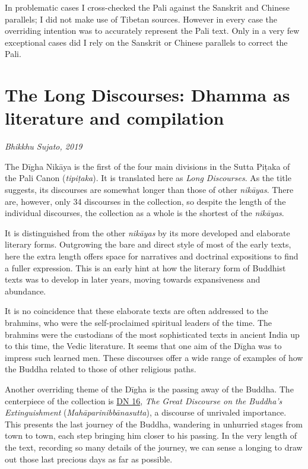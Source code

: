 \documentclass[12pt,openany]{book}%
\newcommand*{\scbyline}[1]{\begin{flushright}\textit{#1}\end{flushright}\bigskip}
\begin{document}
In problematic cases I cross-checked the Pali against the Sanskrit and Chinese parallels; I did not make use of Tibetan sources. However in every case the overriding intention was to accurately represent the Pali text. Only in a very few exceptional cases did I rely on the Sanskrit or Chinese parallels to correct the Pali.

%
\chapter*{The Long Discourses: Dhamma as literature and compilation}

\scbyline{Bhikkhu Sujato, 2019}

The \textsanskrit{Dīgha} \textsanskrit{Nikāya} is the first of the four main divisions in the Sutta \textsanskrit{Piṭaka} of the Pali Canon (\textit{\textsanskrit{tipiṭaka}}). It is translated here as \textit{Long Discourses}. As the title suggests, its discourses are somewhat longer than those of other \textit{\textsanskrit{nikāyas}}. There are, however, only 34 discourses in the collection, so despite the length of the individual discourses, the collection as a whole is the shortest of the \textit{\textsanskrit{nikāyas}}.

It is distinguished from the other \textit{\textsanskrit{nikāyas}} by its more developed and elaborate literary forms. Outgrowing the bare and direct style of most of the early texts, here the extra length offers space for narratives and doctrinal expositions to find a fuller expression. This is an early hint at how the literary form of Buddhist texts was to develop in later years, moving towards expansiveness and abundance.

It is no coincidence that these elaborate texts are often addressed to the brahmins, who were the self-proclaimed spiritual leaders of the time. The brahmins were the custodians of the most sophisticated texts in ancient India up to this time, the Vedic literature. It seems that one aim of the \textsanskrit{Dīgha} was to impress such learned men. These discourses offer a wide range of examples of how the Buddha related to those of other religious paths.

Another overriding theme of the \textsanskrit{Dīgha} is the passing away of the Buddha. The centerpiece of the collection is \href{https://suttacentral.net/dn16}{DN 16}, \textit{The Great Discourse on the Buddha’s Extinguishment} (\textit{\textsanskrit{Mahāparinibbānasutta}}), a discourse of unrivaled importance. This presents the last journey of the Buddha, wandering in unhurried stages from town to town, each step bringing him closer to his passing. In the very length of the text, recording so many details of the journey, we can sense a longing to draw out those last precious days as far as possible.
\end{document}
